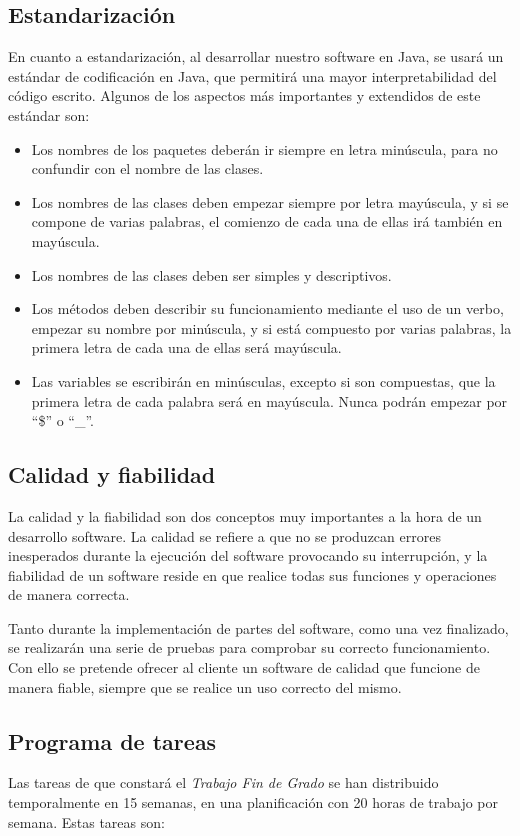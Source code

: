\subsection{Estandarización}
En cuanto a estandarización, al desarrollar nuestro software en Java, se usará un estándar de codificación en Java, que permitirá una mayor interpretabilidad del código escrito. Algunos de los aspectos más importantes y extendidos de este estándar son:
\begin{itemize}
	\item Los nombres de los paquetes deberán ir siempre en letra minúscula, para no confundir con el nombre de las clases.
	\item Los nombres de las clases deben empezar siempre por letra mayúscula, y si se compone de varias palabras, el comienzo de cada una de ellas irá también en mayúscula.
	\item Los nombres de las clases deben ser simples y descriptivos.
	\item Los métodos deben describir su funcionamiento mediante el uso de un verbo, empezar su nombre por minúscula, y si está compuesto por varias palabras, la primera letra de cada una de ellas será mayúscula.
	\item Las variables se escribirán en minúsculas, excepto si son compuestas, que la primera letra de cada palabra será en mayúscula. Nunca podrán empezar por ``\$'' o ``\_''.
\end{itemize}

\subsection{Calidad y fiabilidad}
La calidad y la fiabilidad son dos conceptos muy importantes a la hora de un desarrollo software. La calidad se refiere a que no se produzcan errores inesperados durante la ejecución del software provocando su interrupción, y la fiabilidad de un software reside en que realice todas sus funciones y operaciones de manera correcta.

Tanto durante la implementación de partes del software, como una vez finalizado, se realizarán una serie de pruebas para comprobar su correcto funcionamiento. Con ello se pretende ofrecer al cliente un software de calidad que funcione de manera fiable, siempre que se realice un uso correcto del mismo.

\subsection{Programa de tareas}
Las tareas de que constará el \textit{Trabajo Fin de Grado} se han distribuido temporalmente en 15 semanas, en una planificación con 20 horas de trabajo por semana. Estas tareas son:


